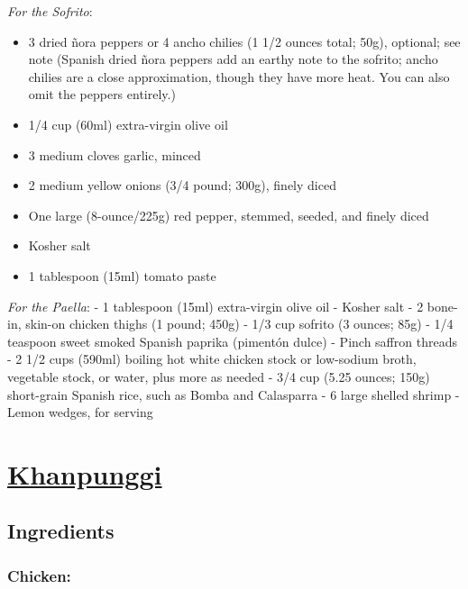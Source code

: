 \documentclass[
]{article}
\providecommand{\tightlist}{%
  \setlength{\itemsep}{0pt}\setlength{\parskip}{0pt}}
\begin{document}
\emph{For the Sofrito}:

\begin{itemize}
\tightlist
\item
  3 dried ñora peppers or 4 ancho chilies (1 1/2 ounces total; 50g), optional; see note (Spanish dried ñora peppers add an earthy note to the sofrito; ancho chilies are a close approximation, though they have more heat. You can also omit the peppers entirely.)
\item
  1/4 cup (60ml) extra-virgin olive oil
\item
  3 medium cloves garlic, minced
\item
  2 medium yellow onions (3/4 pound; 300g), finely diced
\item
  One large (8-ounce/225g) red pepper, stemmed, seeded, and finely diced
\item
  Kosher salt
\item
  1 tablespoon (15ml) tomato paste
\end{itemize}

\emph{For the Paella}:
- 1 tablespoon (15ml) extra-virgin olive oil
- Kosher salt
- 2 bone-in, skin-on chicken thighs (1 pound; 450g)
- 1/3 cup sofrito (3 ounces; 85g)
- 1/4 teaspoon sweet smoked Spanish paprika (pimentón dulce)
- Pinch saffron threads
- 2 1/2 cups (590ml) boiling hot white chicken stock or low-sodium broth, vegetable stock, or water, plus more as needed
- 3/4 cup (5.25 ounces; 150g) short-grain Spanish rice, such as Bomba and Calasparra
- 6 large shelled shrimp
- Lemon wedges, for serving

\hypertarget{khanpunggi}{%
\section{\texorpdfstring{\href{https://www.maangchi.com/recipe/kkanpunggi/comment-page-3}{Khanpunggi}}{Khanpunggi}}\label{khanpunggi}}

\hypertarget{ingredients-1}{%
\subsection{Ingredients}\label{ingredients-1}}

\hypertarget{chicken}{%
\subsubsection{Chicken:}\label{chicken}}
\end{document}
